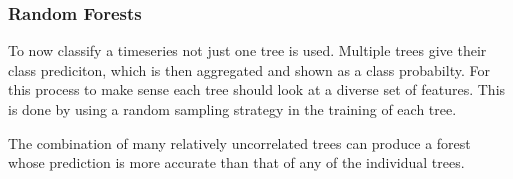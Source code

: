 \subsubsection*{Random Forests}
To now classify a timeseries not just one tree is used. 
Multiple trees give their class prediciton, which is then 
aggregated and shown as a class probabilty. For this process to make sense
each tree should look at a diverse set of features. This is done by 
using a random sampling strategy in the training of each tree. 

The combination of many relatively uncorrelated trees can produce a forest whose prediction is more accurate than that of any of the individual trees. %
